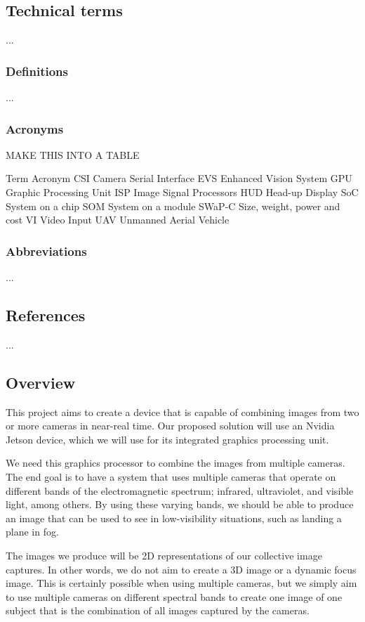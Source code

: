 \documentclass[]{report}
\begin{document}
\subsection{Technical terms}
...
\subsubsection{Definitions}
...
\subsubsection{Acronyms}
MAKE THIS INTO A TABLE

Term
Acronym
CSI
Camera Serial Interface
EVS
Enhanced Vision System
GPU
Graphic Processing Unit
ISP
Image Signal Processors
HUD
Head-up Display
SoC
System on a chip
SOM
System on a module
SWaP-C
Size, weight, power and cost
VI
Video Input
UAV
Unmanned Aerial Vehicle

\subsubsection{Abbreviations}
...

\subsection{References}
...

\subsection{Overview}
This project aims to create a device that is capable of combining images from two or more cameras in near-real time. Our proposed solution will use an Nvidia Jetson device, which we will use for its integrated graphics processing unit.

We need this graphics processor to combine the images from multiple cameras. The end goal is to have a system that uses multiple cameras that operate on different bands of the electromagnetic spectrum; infrared, ultraviolet, and visible light, among others. By using these varying bands, we should be able to produce an image that can be used to see in low-visibility situations, such as landing a plane in fog.

The images we produce will be 2D representations of our collective image captures. In other words, we do not aim to create a 3D image or a dynamic focus image. This is certainly possible when using multiple cameras, but we simply aim to use multiple cameras on different spectral bands to create one image of one subject that is the combination of all images captured by the cameras.
\end{document}
